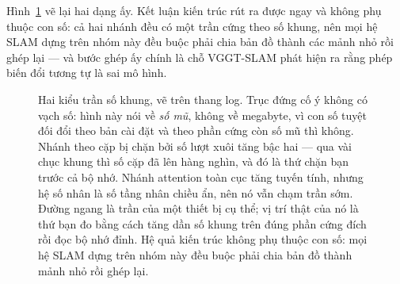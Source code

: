 \documentclass[../../deep_learning.tex]{subfiles}
\begin{document}
Hình~\ref{fig:f30-bo-nho-khung} vẽ lại hai dạng ấy. Kết luận kiến trúc rút ra được ngay và không phụ thuộc con số: cả hai nhánh đều có một trần cứng theo số khung, nên mọi hệ SLAM dựng trên nhóm này đều buộc phải chia bản đồ thành các mảnh nhỏ rồi ghép lại --- và bước ghép ấy chính là chỗ VGGT-SLAM phát hiện ra rằng phép biến đổi tương tự là sai mô hình.

\begin{figure}[H]\centering
{}
\caption{Hai kiểu trần số khung, vẽ trên thang log. Trục đứng cố ý không có vạch số: hình này nói về \emph{số mũ}, không về megabyte, vì con số tuyệt đối đổi theo bản cài đặt và theo phần cứng còn số mũ thì không. Nhánh theo cặp bị chặn bởi số lượt xuôi tăng bậc hai --- qua vài chục khung thì số cặp đã lên hàng nghìn, và đó là thứ chặn bạn trước cả bộ nhớ. Nhánh attention toàn cục tăng tuyến tính, nhưng hệ số nhân là số tầng nhân chiều ẩn, nên nó vẫn chạm trần sớm. Đường ngang là trần của một thiết bị cụ thể; vị trí thật của nó là thứ bạn đo bằng cách tăng dần số khung trên đúng phần cứng đích rồi đọc bộ nhớ đỉnh. Hệ quả kiến trúc không phụ thuộc con số: mọi hệ SLAM dựng trên nhóm này đều buộc phải chia bản đồ thành mảnh nhỏ rồi ghép lại.}
\label{fig:f30-bo-nho-khung}
\end{figure}
\end{document}
